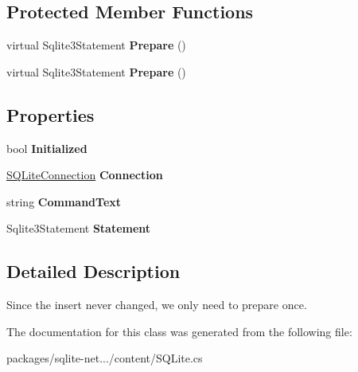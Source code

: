 \subsection*{Protected Member Functions}
\begin{DoxyCompactItemize}
\item 
\hypertarget{classSQLite_1_1PreparedSqlLiteInsertCommand_a207353ff88c74bc45cb076fe3cf463bb}{virtual Sqlite3\-Statement {\bfseries Prepare} ()}\label{classSQLite_1_1PreparedSqlLiteInsertCommand_a207353ff88c74bc45cb076fe3cf463bb}

\item 
\hypertarget{classSQLite_1_1PreparedSqlLiteInsertCommand_a207353ff88c74bc45cb076fe3cf463bb}{virtual Sqlite3\-Statement {\bfseries Prepare} ()}\label{classSQLite_1_1PreparedSqlLiteInsertCommand_a207353ff88c74bc45cb076fe3cf463bb}

\end{DoxyCompactItemize}
\subsection*{Properties}
\begin{DoxyCompactItemize}
\item 
\hypertarget{classSQLite_1_1PreparedSqlLiteInsertCommand_aa0cb80ff10df0d34a9089ffbdb95e233}{bool {\bfseries Initialized}}\label{classSQLite_1_1PreparedSqlLiteInsertCommand_aa0cb80ff10df0d34a9089ffbdb95e233}

\item 
\hypertarget{classSQLite_1_1PreparedSqlLiteInsertCommand_addc71e268ca913cad1d5115448a52ed0}{\hyperlink{classSQLite_1_1SQLiteConnection}{S\-Q\-Lite\-Connection} {\bfseries Connection}}\label{classSQLite_1_1PreparedSqlLiteInsertCommand_addc71e268ca913cad1d5115448a52ed0}

\item 
\hypertarget{classSQLite_1_1PreparedSqlLiteInsertCommand_a0bc903da9bb033cdbfc8c24d8c8d2213}{string {\bfseries Command\-Text}}\label{classSQLite_1_1PreparedSqlLiteInsertCommand_a0bc903da9bb033cdbfc8c24d8c8d2213}

\item 
\hypertarget{classSQLite_1_1PreparedSqlLiteInsertCommand_ac5f15619ff00f2fdeb3551ca369f65ac}{Sqlite3\-Statement {\bfseries Statement}}\label{classSQLite_1_1PreparedSqlLiteInsertCommand_ac5f15619ff00f2fdeb3551ca369f65ac}

\end{DoxyCompactItemize}


\subsection{Detailed Description}
Since the insert never changed, we only need to prepare once. 



The documentation for this class was generated from the following file\-:\begin{DoxyCompactItemize}
\item 
packages/sqlite-\/net.../content/S\-Q\-Lite.\-cs\end{DoxyCompactItemize}
